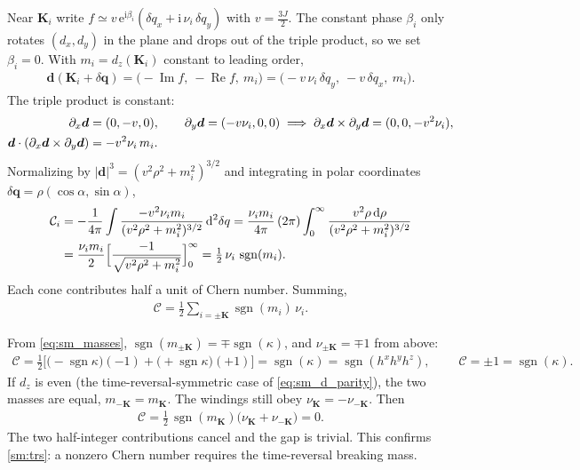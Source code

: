 \documentclass[
  aps,
  prl,
  preprint,
  amsmath,
  amssymb,
  superscriptaddress,
  floatfix
]{revtex4-2}
\newcommand{\ii}{\mathrm{i}}
\newcommand{\ee}{\mathrm{e}}
\newcommand{\pp}{\partial}
\newcommand{\C}{\mathcal{C}}
\newcommand{\sgn}{\operatorname{sgn}}
\renewcommand{\abs}[1]{\left| #1 \right|}
\begin{document}
Near $\bm K_i$ write $f\simeq v\,\ee^{\ii\beta_i}(\delta q_x+\ii\,\nu_i\,
\delta q_y)$ with $v=\tfrac{3J}{2}$. The constant phase $\beta_i$ only
rotates $(d_x,d_y)$ in the plane and drops out of the triple product, so
we set $\beta_i=0$. With $m_i=d_z(\bm K_i)$ constant to leading order,
\begin{align}
  \bm d(\bm K_i+\delta\bm q)
  = \big(-\operatorname{Im}f,\ -\operatorname{Re}f,\ m_i\big)
  = \big(-v\,\nu_i\,\delta q_y,\ -v\,\delta q_x,\ m_i\big) .
\end{align}
The triple product is constant:
\begin{align}
  \pp_x\bm d &= (0,-v,0),\qquad \pp_y\bm d=(-v\nu_i,0,0)
  \;\Longrightarrow\;
  \pp_x\bm d\times\pp_y\bm d=(0,0,-v^2\nu_i), \notag\\
  \bm d\cdot(\pp_x\bm d\times\pp_y\bm d) &= -v^2\nu_i\,m_i .
\end{align}
Normalizing by $\abs{\bm d}^3=(v^2\rho^2+m_i^2)^{3/2}$ and integrating in
polar coordinates $\delta\bm q=\rho(\cos\alpha,\sin\alpha)$,
\begin{align}
  \C_i &= -\frac{1}{4\pi}\int \frac{-v^2\nu_i m_i}{(v^2\rho^2+m_i^2)^{3/2}}\,\dd^2\delta q
  =\frac{\nu_i m_i}{4\pi}\,(2\pi)\int_0^\infty\frac{v^2\rho\,\dd\rho}{(v^2\rho^2+m_i^2)^{3/2}} \notag\\
  &= \frac{\nu_i m_i}{2}\Big[\frac{-1}{\sqrt{v^2\rho^2+m_i^2}}\Big]_0^\infty
  =\tfrac12\,\nu_i\,\sgn(m_i).
\end{align}
Each cone contributes half a unit of Chern number. Summing,
\begin{align}
  \C=\tfrac12\sum_{i=\pm\bm K}\sgn(m_i)\,\nu_i .
  \label{eq:sm_chern_dirac}
\end{align}

From \cref{eq:sm_masses}, $\sgn(m_{\pm\bm K})=\mp\sgn(\kappa)$, and
$\nu_{\pm\bm K}=\mp1$ from above:
\begin{align}
  \C=\tfrac12\Big[\big(-\sgn\kappa\big)(-1)+\big(+\sgn\kappa\big)(+1)\Big]
  =\sgn(\kappa)=\sgn(h^xh^yh^z) ,
  \qquad
  \boxed{\;\C=\pm1=\sgn(\kappa) . \;}
  \label{eq:sm_chern_value}
\end{align}
If $d_z$ is even (the time-reversal-symmetric case of
\cref{eq:sm_d_parity}), the two masses are equal, $m_{-\bm K}=m_{\bm K}$.
The windings still obey $\nu_{\bm K}=-\nu_{-\bm K}$. Then
\begin{align}
  \C=\tfrac12\,\sgn(m_{\bm K})\big(\nu_{\bm K}+\nu_{-\bm K}\big)=0 .
\end{align}
The two half-integer contributions cancel and the gap is trivial. This
confirms \cref{sm:trs}: a nonzero Chern number requires the time-reversal breaking mass.



\end{document}

